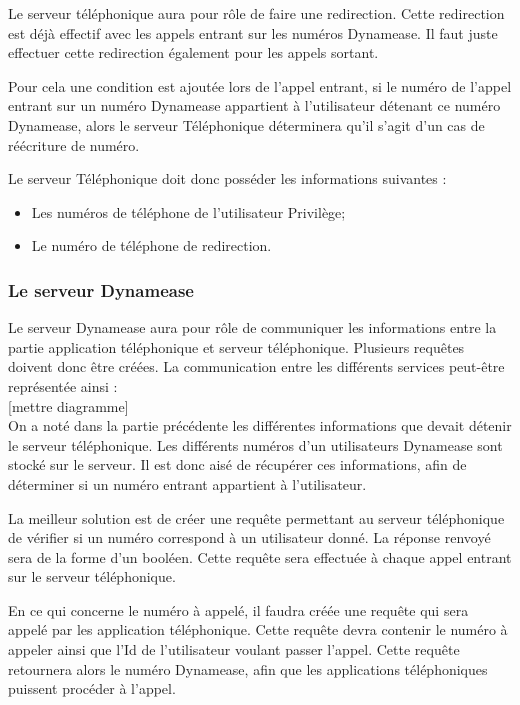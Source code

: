 Le serveur téléphonique aura pour rôle de faire une redirection. Cette redirection est déjà effectif avec les appels entrant sur les numéros Dynamease. Il faut juste effectuer cette redirection également pour les appels sortant.

Pour cela une condition est ajoutée lors de l'appel entrant, si le numéro de l'appel entrant sur un numéro Dynamease appartient à l'utilisateur détenant ce numéro Dynamease, alors le serveur Téléphonique déterminera qu'il s'agit d'un cas de réécriture de numéro.

Le serveur Téléphonique doit donc posséder les informations suivantes :

\begin{itemize}
	\item Les numéros de téléphone de l'utilisateur Privilège;
	\item Le numéro de téléphone de redirection.
\end{itemize}
 

\subsubsection{Le serveur Dynamease}

Le serveur Dynamease aura pour rôle de communiquer les informations entre la partie application téléphonique et serveur téléphonique. Plusieurs requêtes doivent donc être créées. La communication entre les différents services peut-être représentée ainsi :\\

[mettre diagramme]\\

On a noté dans la partie précédente les différentes informations que devait détenir le serveur téléphonique. Les différents numéros d'un utilisateurs Dynamease sont stocké sur le serveur. Il est donc aisé de récupérer ces informations, afin de déterminer si un numéro entrant appartient à l'utilisateur.

La meilleur solution est de créer une requête permettant au serveur téléphonique de vérifier si un numéro correspond à un utilisateur donné. La réponse renvoyé sera de la forme d'un booléen. Cette requête sera effectuée à chaque appel entrant sur le serveur téléphonique.

En ce qui concerne le numéro à appelé, il faudra créée une requête qui sera appelé par les application téléphonique. Cette requête devra contenir le numéro à appeler ainsi que l'Id de l'utilisateur voulant passer l'appel. Cette requête retournera alors le numéro Dynamease, afin que les applications téléphoniques puissent procéder à l'appel.

